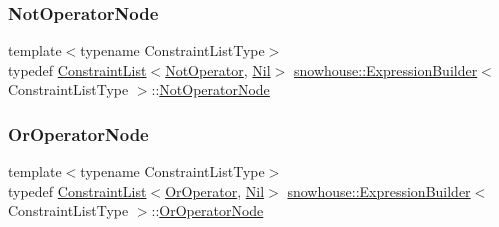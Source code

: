 \mbox{\label{structsnowhouse_1_1ExpressionBuilder_a5de76f3efcd7456a66de89edc66b21a4}} 
\subsubsection{\texorpdfstring{NotOperatorNode}{NotOperatorNode}}
{\footnotesize\ttfamily template$<$typename Constraint\+List\+Type$>$ \\
typedef \mbox{\hyperlink{structsnowhouse_1_1ConstraintList}{Constraint\+List}}$<$\mbox{\hyperlink{structsnowhouse_1_1NotOperator}{Not\+Operator}}, \mbox{\hyperlink{structsnowhouse_1_1Nil}{Nil}}$>$ \mbox{\hyperlink{structsnowhouse_1_1ExpressionBuilder}{snowhouse\+::\+Expression\+Builder}}$<$ Constraint\+List\+Type $>$\+::\mbox{\hyperlink{structsnowhouse_1_1ExpressionBuilder_a5de76f3efcd7456a66de89edc66b21a4}{Not\+Operator\+Node}}}

\mbox{\label{structsnowhouse_1_1ExpressionBuilder_a57a8b9f5c8cdc9cc9b8ae5165a515e61}} 
\subsubsection{\texorpdfstring{OrOperatorNode}{OrOperatorNode}}
{\footnotesize\ttfamily template$<$typename Constraint\+List\+Type$>$ \\
typedef \mbox{\hyperlink{structsnowhouse_1_1ConstraintList}{Constraint\+List}}$<$\mbox{\hyperlink{structsnowhouse_1_1OrOperator}{Or\+Operator}}, \mbox{\hyperlink{structsnowhouse_1_1Nil}{Nil}}$>$ \mbox{\hyperlink{structsnowhouse_1_1ExpressionBuilder}{snowhouse\+::\+Expression\+Builder}}$<$ Constraint\+List\+Type $>$\+::\mbox{\hyperlink{structsnowhouse_1_1ExpressionBuilder_a57a8b9f5c8cdc9cc9b8ae5165a515e61}{Or\+Operator\+Node}}}




